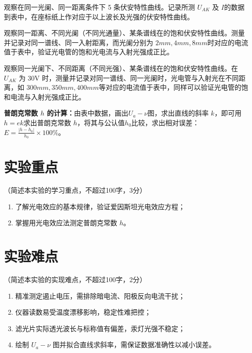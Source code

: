 \documentclass[10pt,a4paper]{ctexart}
\newcommand{\xiaosi}{\fontsize{12pt}{16pt}\selectfont}
\begin{document}
    观察在同一光阑、同一距离条件下 5 条伏安特性曲线。记录所测  $U_{AK}$ 及 $I$的数据到表中，在座标纸上作对应于以上波长及光强的伏安特性曲线。
    
    观察同一距离、不同光阑（不同光通量）、某条谱线在的饱和伏安特性曲线。测量并记录对同一谱线、同一入射距离，而光阑分别为 $2mm,4mm,8mm$时对应的电流值于表中，验证光电管的饱和光电流与入射光强成正比。

    观察同一光阑下、不同距离（不同光强）、某条谱线在的饱和伏安特性曲线。在 $U_{AK}$ 为 30V 时，测量并记录对同一谱线、同一光阑时，光电管与入射光在不同距
离，如 $300mm,350mm,400mm$等对应的电流值于表中，同样可以验证光电管的饱
和电流与入射光强成正比。


    
    \textbf{普朗克常数 $h$ 的计算：}由表中数据，画出\(U_a - \nu\)图，求出直线的斜率 $k$，即可用\(h = ek\)求出普朗克常数 $h$，将其与公认值\(h_0\)比较，求出相对误差：\(E = \frac{|h - h_0|}{h_0}×100\%\)。
   
    
    \section{实验重点}

    \xiaosi（简述本实验的学习重点，不超过100字，3分）


\begin{enumerate}   
        \item 了解光电效应的基本规律，验证爱因斯坦光电效应方程；
        \item 掌握用光电效应法测定普朗克常数 $h$。
    \end{enumerate}    
    
    
    \section{实验难点}
    
    \xiaosi（简述本实验的实现难点，不超过100字，2分）

    \begin{enumerate}    
        \item 精准测定遏止电压，需排除暗电流、阳极反向电流干扰；
        \item 仪器读数易受温度漂移影响，稳定性难把控；
        \item 滤光片实际透光波长与标称值有偏差，汞灯光强不稳定；
        \item 绘制 $U_a-\nu$ 图并拟合直线求斜率，需保证数据准确性以减小误差。
    \end{enumerate} \
\end{document}
